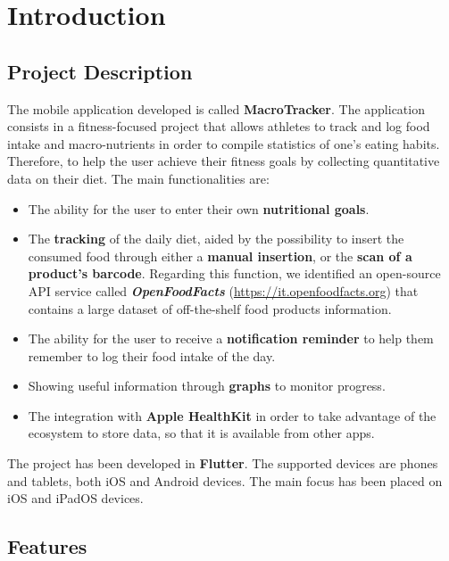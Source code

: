 \documentclass{Configuration_Files/PoliMi3i_thesis}
\begin{document}
\mainmatter %


\chapter{Introduction}
\section{Project Description}
The mobile application developed is called \textbf{MacroTracker}. The application consists in a fitness-focused project that allows athletes to track and log food intake and macro-nutrients in order to compile statistics of one's eating habits.
Therefore, to help the user achieve their fitness goals by collecting quantitative data on their diet. 
The main functionalities are:
\begin{itemize}
    \item The ability for the user to enter their own \textbf{nutritional goals}. 
    \item The \textbf{tracking} of the daily diet, aided by the possibility to insert the consumed food through either a \textbf{manual insertion}, or the \textbf{scan of a product's barcode}. 
    Regarding this function, we identified an open-source API service called \textbf{\textit{OpenFoodFacts}} (\url{https://it.openfoodfacts.org}) that contains a large dataset of off-the-shelf food products information. 
    \item The ability for the user to receive a \textbf{notification reminder} to help them remember to log their food intake of the day.
    \item Showing useful information through \textbf{graphs} to monitor progress. 
    \item The integration with \textbf{Apple HealthKit} in order to take advantage of the ecosystem to store data, so that it is available from other apps. 
\end{itemize}
The project has been developed in \textbf{Flutter}. The supported devices are phones and tablets, both iOS and Android devices. The main focus has been placed on iOS and iPadOS devices.
\section{Features}
\end{document}
